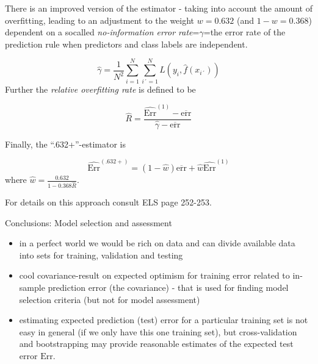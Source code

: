 \documentclass[
  ignorenonframetext,
]{beamer}
\providecommand{\tightlist}{%
  \setlength{\itemsep}{0pt}\setlength{\parskip}{0pt}}
\begin{document}
\begin{frame}

There is an improved version of the estimator - taking into account the
amount of overfitting, leading to an adjustment to the weight
\(w=0.632\) (and \(1-w=0.368\)) dependent on a socalled
\emph{no-information error rate}=\(\gamma\)=the error rate of the
prediction rule when predictors and class labels are independent.

\[\hat{\gamma}=\frac{1}{N^2}\sum_{i=1}^{N}\sum_{i´=1}^N L(y_i,\hat{f}(x_{i´}))\]
Further the \emph{relative overfitting rate} is defined to be

\begin{block}{\[ \hat{R}=\frac{\widehat{\text{Err}}^{(1)}-\overline{\text{err}}}{\hat{\gamma}-\overline{\text{err}}}\]}

Finally, the ``.632+''-estimator is

\[\widehat{\text{Err}}^{(.632+)}=(1-\hat{w}) \overline{\text{err}}+ \hat{w} \widehat{\text{Err}}^{(1)}\]
where \(\hat{w}=\frac{0.632}{1-0.368 \hat{R}}\).

For details on this approach consult ELS page 252-253.

\end{block}

\end{frame}

\begin{frame}{Conclusions: Model selection and assessment}
\protect\hypertarget{conclusions-model-selection-and-assessment}{}

\begin{itemize}
\tightlist
\item
  in a perfect world we would be rich on data and can divide available
  data into sets for training, validation and testing
\item
  cool covariance-result on expected optimism for training error related
  to in-sample prediction error (the covariance) - that is used for
  finding model selection criteria (but not for model assessment)
\item
  estimating expected prediction (test) error for a particular training
  set is not easy in general (if we only have this one training set),
  but cross-validation and bootstrapping may provide reasonable
  estimates of the expected test error \(\text{Err}\).
\end{itemize}

\end{frame}
\end{document}
